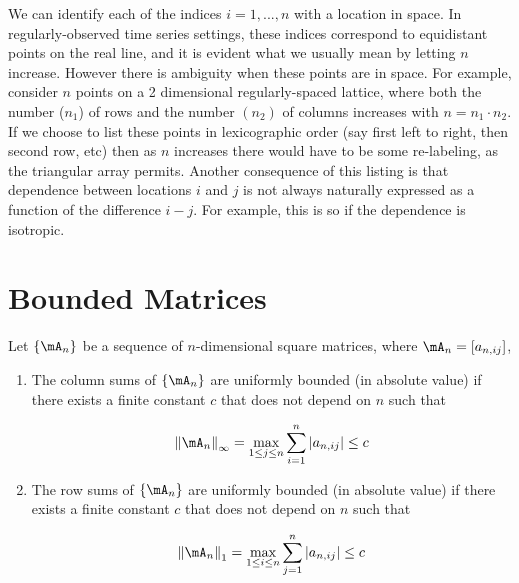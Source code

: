\documentclass[english,12pt]{book}\usepackage[]{graphicx}\usepackage[]{xcolor}
\begin{document}
We can identify each of the indices $i = 1,...,n$ with a location in space. In regularly-observed time series settings, these indices correspond to equidistant points on the real line, and it is evident what we usually mean by letting $n$ increase. However there is ambiguity when these points are in space. For example, consider $n$ points on a 2 dimensional regularly-spaced lattice, where both the number ($n_1$) of rows and the number $(n_2)$ of columns increases with $n=n_1\cdot n_2$. If we choose to list these points in lexicographic order (say first left to right, then second row, etc) then as $n$ increases there would have to be some re-labeling, as the triangular array permits. Another consequence of this listing is that dependence between locations $i$ and $j$ is not always naturally expressed as a function of the difference $i-j$. For example, this is so if the dependence is isotropic. 


\section{Bounded Matrices}

\begin{definition}\label{def:Bounded_Matrices}
Let $\left\lbrace \mA_n \right\rbrace$ be a sequence of $n$-dimensional square matrices, where $\mA_n = \left[a_{n,ij}\right]$,
  \begin{enumerate}
    \item The column sums of $\left\lbrace \mA_n \right\rbrace$ are uniformly bounded (in absolute value) if there exists a finite constant $c$ that does not depend on $n$ such that 
    
    \begin{equation*}
      \left\|\mA_n\right\|_{\infty} = \max_{1 \leq j\leq n}\sum_{i = 1}^n\left|a_{n, ij}\right| \leq c
    \end{equation*}
     \item The row sums of $\left\lbrace \mA_n \right\rbrace$ are uniformly bounded (in absolute value) if there exists a finite constant $c$ that does not depend on $n$ such that 
    
    \begin{equation*}
      \left\|\mA_n\right\|_1 = \max_{1 \leq i\leq n}\sum_{j = 1}^n\left|a_{n, ij}\right| \leq c
    \end{equation*}
  \end{enumerate}
\end{definition}
\end{document}
